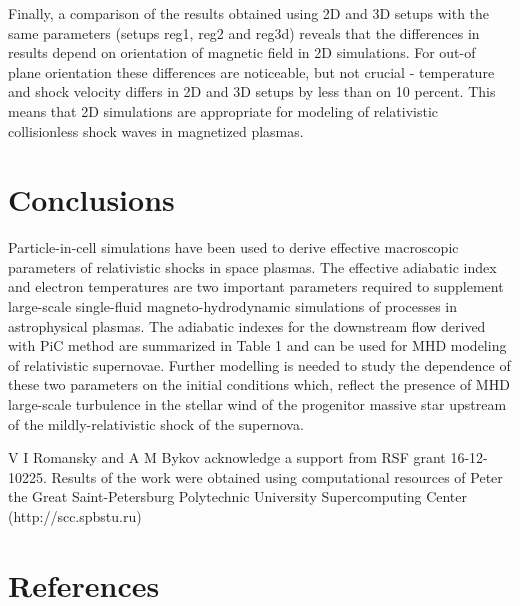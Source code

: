 \documentclass[a4paper]{jpconf}
\begin{document}
	Finally, a comparison of the results obtained using 2D and 3D setups with the same parameters (setups reg1, reg2 and reg3d) reveals that the differences in results depend on orientation of magnetic field in 2D simulations. For out-of plane orientation these differences are noticeable, but not crucial - temperature and shock velocity differs in 2D and 3D setups by less than on 10 percent. This means that 2D simulations are appropriate for modeling of relativistic collisionless shock waves in magnetized plasmas. 
	
	\section{Conclusions}
	
	Particle-in-cell simulations have been used to derive effective macroscopic parameters of relativistic shocks in space plasmas. The effective adiabatic index and electron temperatures are two important parameters required to supplement large-scale single-fluid magneto-hydrodynamic simulations of processes in astrophysical plasmas. The adiabatic indexes for the downstream flow derived with PiC method are summarized in Table 1 and can be used for MHD modeling of relativistic
	supernovae. Further modelling is needed to study the dependence of these two parameters on the initial conditions which, reflect the presence of MHD large-scale turbulence in the stellar wind of the progenitor massive star upstream of the  mildly-relativistic shock of the supernova. 
	
	\ack
	V I Romansky and A M Bykov acknowledge a support from RSF grant 16-12-10225.
	Results of the work were obtained using computational resources of Peter the Great Saint-Petersburg Polytechnic University Supercomputing Center (http://scc.spbstu.ru)
	
	\section*{References}
	

	
\end{document}
